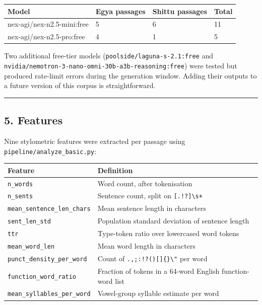 {\def\LTcaptype{none} %
\begin{longtable}[]{@{}llll@{}}
\toprule\noalign{}
Model & Egya passages & Shittu passages & Total \\
\midrule\noalign{}
\endhead
\bottomrule\noalign{}
\endlastfoot
nex-agi/nex-n2.5-mini:free & 5 & 6 & 11 \\
nex-agi/nex-n2.5-pro:free & 4 & 1 & 5 \\
\end{longtable}
}

Two additional free-tier models (\texttt{poolside/laguna-s-2.1:free} and
\texttt{nvidia/nemotron-3-nano-omni-30b-a3b-reasoning:free}) were tested
but produced rate-limit errors during the generation window. Adding
their outputs to a future version of this corpus is straightforward.

\begin{center}\rule{0.5\linewidth}{0.5pt}\end{center}

\subsection{5. Features}\label{features}

Nine stylometric features were extracted per passage using
\texttt{pipeline/analyze\_basic.py}:

{\def\LTcaptype{none} %
\begin{longtable}[]{@{}
  >{\raggedright\arraybackslash}p{}
  >{\raggedright\arraybackslash}p{}@{}}
\toprule\noalign{}
\begin{minipage}[b]{\linewidth}\raggedright
Feature
\end{minipage} & \begin{minipage}[b]{\linewidth}\raggedright
Definition
\end{minipage} \\
\midrule\noalign{}
\endhead
\bottomrule\noalign{}
\endlastfoot
\texttt{n\_words} & Word count, after tokenisation \\
\texttt{n\_sents} & Sentence count, split on
\texttt{{[}.!?{]}\textbackslash{}s+} \\
\texttt{mean\_sentence\_len\_chars} & Mean sentence length in
characters \\
\texttt{sent\_len\_std} & Population standard deviation of sentence
length \\
\texttt{ttr} & Type-token ratio over lowercased word tokens \\
\texttt{mean\_word\_len} & Mean word length in characters \\
\texttt{punct\_density\_per\_word} & Count of
\texttt{.,;:!?(){[}{]}\{\}\textbackslash{}"\textquotesingle{}} per
word \\
\texttt{function\_word\_ratio} & Fraction of tokens in a 64-word English
function-word list \\
\texttt{mean\_syllables\_per\_word} & Vowel-group syllable estimate per
word \\
\end{longtable}
}


